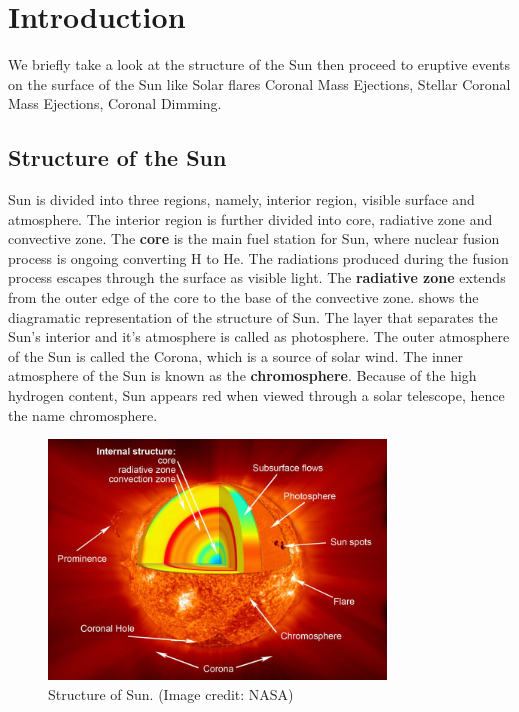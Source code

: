 \section{Introduction}

We briefly take a look at the structure of the Sun then proceed to eruptive events on the surface of the Sun like Solar flares Coronal Mass Ejections, Stellar Coronal Mass Ejections, Coronal Dimming.

\subsection{Structure of the Sun}

Sun is divided into three regions, namely, interior region, visible surface and atmosphere. The interior region is further divided into core, radiative zone and convective zone. The \textbf{core} is the main fuel station for Sun, where nuclear fusion process is ongoing converting H to He. The radiations produced during the fusion process escapes through the surface as visible light. The \textbf{radiative zone} extends from the outer edge of the core to the base of the convective zone.  shows the diagramatic representation of the structure of Sun. The layer that separates the Sun's interior and it's atmosphere is called as photosphere. The outer atmosphere of the Sun is called the Corona, which is a source of solar wind. The inner atmosphere of the Sun is known as the \textbf{chromosphere}. Because of the high hydrogen content, Sun appears red when viewed through a solar telescope, hence the name chromosphere.

\begin{figure}[ht]
    \centering
    \includegraphics[width=0.8\textwidth]{images/structure_of_sun.jpg}
    \caption[Structure of the Sun]{Structure of Sun. (Image credit: NASA)}
    \label{fig:structure_of_sun}
\end{figure}

